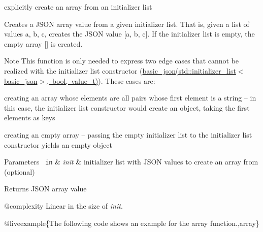 explicitly create an array from an initializer list 

Creates a J\+S\+ON array value from a given initializer list. That is, given a list of values {\ttfamily a, b, c}, creates the J\+S\+ON value {\ttfamily \mbox{[}a, b, c\mbox{]}}. If the initializer list is empty, the empty array {\ttfamily \mbox{[}\mbox{]}} is created.

\begin{DoxyNote}{Note}
This function is only needed to express two edge cases that cannot be realized with the initializer list constructor (\mbox{\hyperlink{classnlohmann_1_1basic__json_afbad48316e7cd37366ba3ac5d7e5859e}{basic\+\_\+json(std\+::initializer\+\_\+list$<$basic\+\_\+json$>$, bool, value\+\_\+t)}}). These cases are\+:
\begin{DoxyEnumerate}
\item creating an array whose elements are all pairs whose first element is a string -- in this case, the initializer list constructor would create an object, taking the first elements as keys
\item creating an empty array -- passing the empty initializer list to the initializer list constructor yields an empty object
\end{DoxyEnumerate}
\end{DoxyNote}

\begin{DoxyParams}[1]{Parameters}
\mbox{\texttt{ in}}  & {\em init} & initializer list with J\+S\+ON values to create an array from (optional)\\
\hline
\end{DoxyParams}
\begin{DoxyReturn}{Returns}
J\+S\+ON array value
\end{DoxyReturn}
@complexity Linear in the size of {\itshape init}.

@liveexample\{The following code shows an example for the {\ttfamily array} function.,array\}

